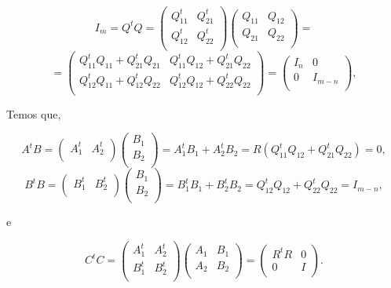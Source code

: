 $$
I_m = Q^t Q = \left(
\begin{array}{ll}
Q^t_{11} & Q^t_{21} \\
Q^t_{12} & Q^t_{22} \\
\end{array}
\right)
 \left(
\begin{array}{ll}
Q_{11} & Q_{12} \\
Q_{21} & Q_{22} \\
\end{array}
\right) =
$$
$$
 = \left(
\begin{array}{ll}
Q^t_{11} Q_{11} + Q^t_{21} Q_{21} & Q^t_{11} Q_{12} + Q^t_{21} Q_{22} \\
Q^t_{12} Q_{11} + Q^t_{12} Q_{22} & Q^t_{12} Q_{12} + Q^t_{22} Q_{22} \\
\end{array}
\right) = \left(
\begin{array}{ll}
I_n & 0 \\
0 & I_{m-n} \\
\end{array}
\right),
$$

\noindent Temos que,

$$
A^t B = \left(
\begin{array}{ll}
A^t_1 & A^t_2 \\
\end{array} \right)
\left(
\begin{array}{l}
 B_1\\
 B_2 \\
\end{array} \right) =
A^t_1 B_1 + A^t_2 B_2 = R \left( Q^t_{11} Q_{12} + Q^t_{21} Q_{22} \right) = 0,
$$
$$
B^t B = \left(
\begin{array}{ll}
B^t_1 & B^t_2 \\
\end{array} \right)
\left(
\begin{array}{l}
 B_1\\
 B_2 \\
\end{array} \right) =
B^t_1 B_1 + B^t_2 B_2 = Q^t_{12} Q_{12} + Q^t_{22} Q_{22}  = I_{m-n},
$$

\noindent e

$$
C^t C = \left(
\begin{array}{ll}
A^t_1 & A^t_2 \\
B^t_1 & B^t_2 \\
\end{array} \right)
\left(
\begin{array}{ll}
 A_1 & B_1\\
 A_2 & B_2 \\
\end{array} \right) =
\left(
\begin{array}{cc}
 R^t R & 0\\
 0 & I \\
\end{array} \right).
$$

